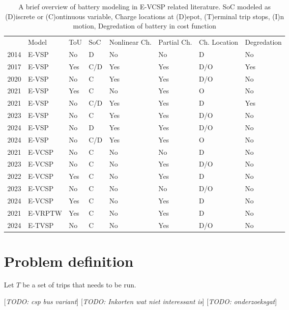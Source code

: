 \documentclass[]{article}
\newcommand{\todo}[1]{{\color{red}[\textit{TODO: #1}]}}
\begin{document}
\begin{table}[h]
  \centering
  \begin{tabular}{clllllll}
    \toprule
                                     & Model   & ToU & SoC & Nonlinear Ch. & Partial Ch. & Ch. Location & Degredation \\
    \cmidrule(lr){2-8}
    \cite{Li2014} 2014               & E-VSP   & No  & D   & No            & No          & D            & No          \\
    \cite{vanKootenNiekerk2017} 2017 & E-VSP   & Yes & C/D & Yes           & Yes         & D/O          & Yes         \\
    \cite{Olsen2020} 2020            & E-VSP   & No  & C   & Yes           & Yes         & D/O          & No          \\
    \cite{Jiang2021} 2021            & E-VSP   & Yes & C   & No            & Yes         & O            & No          \\
    \cite{Zhang2021} 2021            & E-VSP   & No  & C/D & Yes           & Yes         & D            & Yes         \\
    \cite{Parmentier2023} 2023       & E-VSP   & No  & C   & Yes           & Yes         & D/O          & No          \\
    \cite{deVos2024} 2024            & E-VSP   & No  & D   & Yes           & Yes         & D/O          & No          \\
    \cite{Pulyassary2024} 2024       & E-VSP   & No  & C/D & Yes           & Yes         & O            & No          \\
    \addlinespace[0.4em]
    \cite{Perumal2021} 2021          & E-VCSP  & No  & C   & No            & No          & D            & No          \\
    \cite{Sistig2023} 2023           & E-VCSP  & No  & C   & No            & Yes         & D/O          & No          \\
    \cite{Wang2022} 2022             & E-VCSP  & Yes & C   & No            & Yes         & D            & No          \\
    \cite{Shen2023} 2023             & E-VCSP  & No  & C   & No            & No          & D/O          & No          \\
    \cite{Cong2024} 2024             & E-VCSP  & Yes & C   & No            & Yes         & D            & No          \\
    \addlinespace[0.4em]
    \cite{Ham2021} 2021              & E-VRPTW & Yes & C   & No            & Yes         & D            & No          \\
    \cite{Stadnichuk2024} 2024       & E-TVSP  & No  & C   & No            & Yes         & D/O          & No          \\
    \bottomrule
  \end{tabular}
  \caption{A brief overview of battery modeling in E-VCSP related literature. SoC modeled as (D)iscrete or (C)ontinuous variable, Charge locations at (D)epot, (T)erminal trip stops, (I)n motion, Degredation of battery in cost function}
  \label{tab:eVCSP-lit}
\end{table}

\section{Problem definition}
\label{sec:problem_def}
Let $T$ be a set of trips that needs to be run.

\todo{csp bus variant}
\todo{Inkorten wat niet interessant is}
\todo{onderzoeksgat}
\printbibliography
\end{document}
